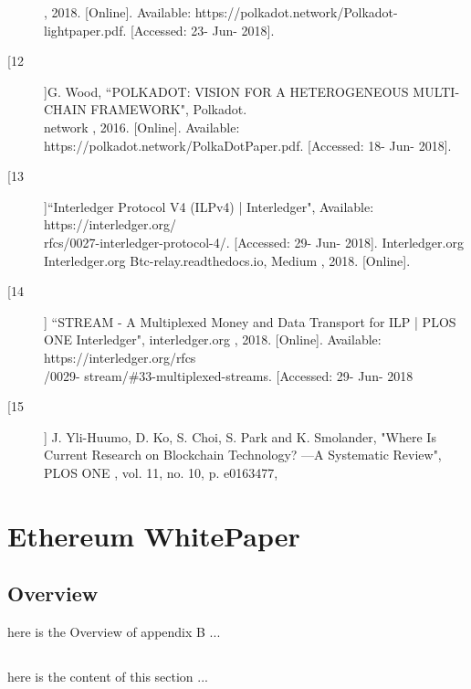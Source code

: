 \documentclass[a4paper,twoside,phd]{BYUPhys}
\begin{document}
\begin{description}
, 2018. [Online]. Available:
 https://polkadot.network/Polkadot-lightpaper.pdf. [Accessed: 23- Jun- 2018].
\item[[12]]G. Wood, ``POLKADOT: VISION FOR A HETEROGENEOUS MULTI-CHAIN
  FRAMEWORK",
Polkadot.\\network
, 2016. [Online]. Available:
 https://polkadot.network/PolkaDotPaper.pdf. [Accessed: 18- Jun- 2018].
\item[[13]]``Interledger Protocol V4 (ILPv4) | Interledger",
Available: https://interledger.org/\\rfcs/0027-interledger-protocol-4/. [Accessed: 29- Jun- 2018].
Interledger.org
Interledger.org
Btc-relay.readthedocs.io,
Medium
, 2018. [Online].
\item[[14]] ``STREAM
- A
Multiplexed
Money and Data Transport for ILP |
PLOS ONE
  Interledger", interledger.org
, 2018. [Online]. Available: https://interledger.org/rfcs\\/0029-
 stream/\#33-multiplexed-streams. [Accessed: 29- Jun- 2018
\item[[15]] J. Yli-Huumo, D. Ko, S. Choi, S. Park and K. Smolander, "Where Is Current Research on
  Blockchain Technology? —A Systematic Review", PLOS ONE
, vol. 11, no. 10, p. e0163477,
 


\end{description}
\chapter{Ethereum WhitePaper}
\section{Overview}
here is the Overview of appendix B ...
\section{}
here is the content of this section ...

%

%

%
\end{document}
